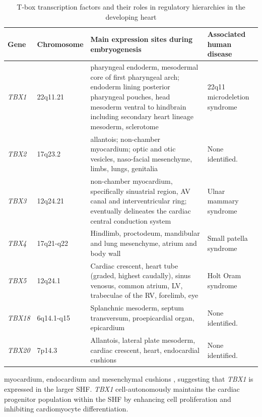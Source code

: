 \begin{refsection}
\begin{landscape}
\begin{table}[!p]
\renewcommand{\arraystretch}{1.4}
\centering
\caption[T-box transcription factors]{T-box transcription factors and their roles in regulatory hierarchies in the developing heart \cite{stennard2005t}}
\label{tab:1_2}
\begin{tabular}{  P{1in} P{1in} p{4.5in}  P{2in}  }
\toprule
	\textbf{Gene} & \textbf{Chromosome} & \textbf{Main expression sites during embryogenesis} & \textbf{Associated human disease} \\ \toprule
	\textit{TBX1} & 22q11.21 & pharyngeal endoderm, mesodermal core of first pharyngeal arch;  endoderm lining posterior pharyngeal pouches, head mesoderm ventral to hindbrain including secondary heart lineage mesoderm, sclerotome & 22q11 microdeletion syndrome \\ \midrule
	\textit{TBX2} & 17q23.2 & allantois; non-chamber myocardium; optic and otic vesicles, naso-facial mesenchyme, limbs, lungs, genitalia & None identified. \\ \midrule
	\textit{TBX3} & 12q24.21 & non-chamber myocardium, specifically sinuatrial region, AV canal and interventricular ring; eventually delineates the cardiac central conduction system & Ulnar mammary syndrome \\ \midrule
	\textit{TBX4} & 17q21-q22 & Hindlimb, proctodeum, mandibular and lung mesenchyme, atrium and body wall & Small patella syndrome \\ \midrule
	\textit{TBX5} & 12q24.1 & Cardiac crescent, heart tube (graded, highest caudally), sinus venosus, common atrium, LV, trabeculae of the RV, forelimb, eye & Holt Oram syndrome \\ \midrule
	\textit{TBX18} & 6q14.1-q15 & Splanchnic mesoderm, septum transversum, proepicardial organ, epicardium & None identified. \\ \midrule
	\textit{TBX20} & 7p14.3 & Allantois, lateral plate mesoderm, cardiac crescent, heart, endocardial cushions & None identified. \\ \bottomrule
\end{tabular}
\end{table}
\end{landscape}

 myocardium, endocardium and mesenchymal cushions \cite{naiche2005t,plageman2005t}, suggesting that \textit{TBX1} is expressed in the larger SHF. \textit{TBX1} cell-autonomously maintains the cardiac progenitor population within the SHF by enhancing cell proliferation and inhibiting cardiomyocyte differentiation.


\end{refsection}
